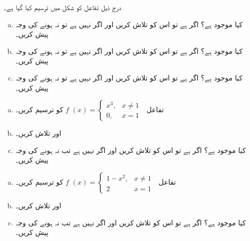 درج ذیل تفاعل کو شکل  میں ترسیم کیا گیا ہے۔
\begin{enumerate}[a.]
\item
کیا  موجود ہے؟ اگر ہے تو اس کو تلاش کریں اور اگر نہیں ہے تو نہ ہونے کی وجہ پیش کریں۔
\item
کیا  موجود ہے؟ اگر ہے تو اس کو تلاش کریں اور اگر نہیں ہے تو نہ ہونے کی وجہ پیش کریں۔
\item
کیا  موجود ہے؟ اگر ہے تو اس کو تلاش کریں اور اگر نہیں ہے تو نہ  ہونے کی وجہ پیش کریں۔
\end{enumerate}
\begin{enumerate}[a.]
\item
تفاعل
$f\,\,(x)=\begin{cases} x^3,&x\ne 1\\ 0,&x=1 \,\,\end{cases}$
کو ترسیم کریں۔
\item
{} اور  تلاش کریں۔
\item
کیا  موجود ہے؟ اگر ہے تو اس کو تلاش کریں اور اگر نہیں ہے تب نہ  ہونے کی وجہ پیش کریں۔
\end{enumerate}
\begin{enumerate}[a.]
\item
تفاعل
$f\,\,(x)=\begin{cases} 1-x^2,&x\ne 1\\ 2&x=1 \,\,\end{cases}$
کو ترسیم کریں۔
\item
{} اور  تلاش کریں۔
\item
کیا  موجود ہے؟ اگر ہے تو اس کو تلاش کریں اور اگر نہیں ہے تب نہ  ہونے کی وجہ پیش کریں۔
\end{enumerate}
